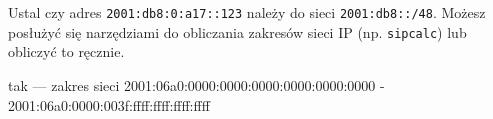 % 
% 
% 
% 



\dbEntryCheckResults
Ustal czy adres \Verb$2001:db8:0:a17::123$ należy do sieci \Verb$2001:db8::/48$. Możesz posłużyć się narzędziami do obliczania zakresów sieci IP (np. \Verb#sipcalc#) lub obliczyć to ręcznie.
\fi

\dbEntryCheckResults
tak --- zakres sieci 2001:06a0:0000:0000:0000:0000:0000:0000 - 2001:06a0:0000:003f:ffff:ffff:ffff:ffff
\fi


